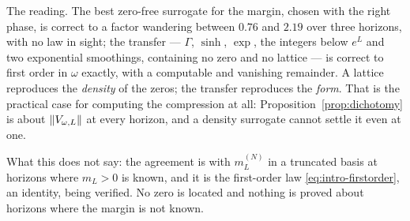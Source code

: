 The reading. The best zero-free surrogate for the margin, chosen with the right
phase, is correct to a factor wandering between $0.76$ and $2.19$ over three
horizons, with no law in sight; the transfer --- $\Gamma$, $\sinh$, $\exp$, the
integers below $e^L$ and two exponential smoothings, containing no zero and no
lattice --- is correct to first order in $\omega$ exactly, with a computable and
vanishing remainder. A lattice reproduces the \emph{density} of the zeros; the
transfer reproduces the \emph{form}. That is the practical case for computing
the compression at all: Proposition~\ref{prop:dichotomy} is about
$\lVert V_{\omega,L}\rVert$ at every horizon, and a density surrogate cannot settle it
even at one.

What this does not say: the agreement is with $m_L^{(N)}$ in a truncated basis at
horizons where $m_L>0$ is known, and it is the first-order law
\eqref{eq:intro-firstorder}, an identity, being verified. No zero is located and
nothing is proved about horizons where the margin is not known.
